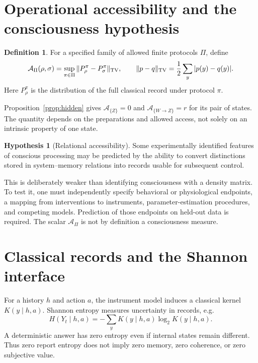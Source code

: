 \documentclass[11pt,a4paper]{article}
\theoremstyle{definition}
\newtheorem{definition}[theorem]{Definition}
\newtheorem{hypothesis}[theorem]{Hypothesis}
\newcommand{\TV}{\operatorname{TV}}
\begin{document}
\section{Operational accessibility and the consciousness hypothesis}
\begin{definition}
For a specified family of allowed finite protocols $\Pi$, define
\[
 \mathcal A_\Pi(\rho,\sigma)=\sup_{\pi\in\Pi}
 \|P_\rho^\pi-P_\sigma^\pi\|_{\TV},\qquad
 \|p-q\|_{\TV}={1\over2}\sum_y|p(y)-q(y)|.
\]
Here $P_\rho^\pi$ is the distribution of the full classical record under protocol $\pi$.
\end{definition}
Proposition~\ref{prop:hidden} gives $\mathcal A_{\{Z\}}=0$ and $\mathcal A_{\{W\to Z\}}=r$ for its pair of states. The quantity depends on the preparations and allowed access, not solely on an intrinsic property of one state.

\begin{hypothesis}[Relational accessibility]
Some experimentally identified features of conscious processing may be predicted by the ability to convert distinctions stored in system--memory relations into records usable for subsequent control.
\end{hypothesis}
This is deliberately weaker than identifying consciousness with a density matrix. To test it, one must independently specify behavioral or physiological endpoints, a mapping from interventions to instruments, parameter-estimation procedures, and competing models. Prediction of those endpoints on held-out data is required. The scalar $\mathcal A_\Pi$ is not by definition a consciousness measure.

\section{Classical records and the Shannon interface}
For a history $h$ and action $a$, the instrument model induces a classical kernel $K(y\mid h,a)$. Shannon entropy measures uncertainty in records, e.g.
\[
 H(Y_t\mid h,a)=-\sum_yK(y\mid h,a)\log_2K(y\mid h,a).
\]
A deterministic answer has zero entropy even if internal states remain different. Thus zero report entropy does not imply zero memory, zero coherence, or zero subjective value.
\end{document}
